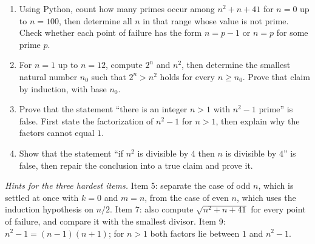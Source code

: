 \begin{latihan}
\begin{enumerate}
  \item Using Python, count how many primes occur among $n^{2}+n+41$ for
        $n = 0$ up to $n = 100$, then determine all $n$ in that range whose
        value is not prime. Check whether each point of failure has the form
        $n = p-1$ or $n = p$ for some prime $p$.

  \item For $n = 1$ up to $n = 12$, compute $2^{n}$ and $n^{2}$, then determine
        the smallest natural number $n_{0}$ such that $2^{n} > n^{2}$ holds for every
        $n \geq n_{0}$. Prove that claim by induction, with base $n_{0}$.

  \item Prove that the statement ``there is an integer $n > 1$ with
        $n^{2}-1$ prime'' is false. First state the factorization of $n^{2}-1$
        for $n > 1$, then explain why the factors cannot equal $1$.

  \item Show that the statement ``if $n^{2}$ is divisible by $4$ then $n$ is divisible
        by $4$'' is false, then repair the conclusion into a true claim and
        prove it.
\end{enumerate}

\par\smallskip\noindent\textit{Hints for the three hardest items.} Item 5: separate the
case of odd $n$, which is settled at once with $k=0$ and $m=n$, from the case of even $n$,
which uses the induction hypothesis on $n/2$. Item 7: also compute $\sqrt{n^{2}+n+41}$
for every point of failure, and compare it with the smallest divisor. Item 9: $n^{2}-1 = (n-1)(n+1)$; for $n > 1$ both factors lie between $1$
and $n^{2}-1$.
\end{latihan}

